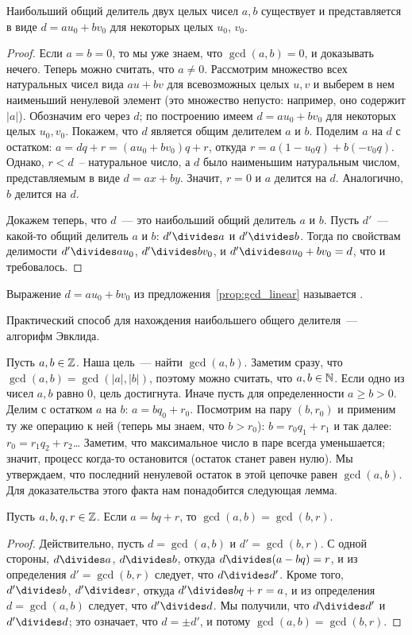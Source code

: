 \begin{proposition}\label{prop:gcd_linear}
Наибольший общий делитель двух целых чисел $a,b$ существует и
представляется в виде $d=au_0+bv_0$ для некоторых целых $u_0$, $v_0$.
\end{proposition}
\begin{proof}
Если $a=b=0$, то мы уже знаем, что $\gcd(a,b)=0$, и доказывать
нечего. Теперь можно считать, что $a\neq 0$.
Рассмотрим множество всех натуральных чисел вида $au+bv$ для
всевозможных целых $u,v$ и выберем в нем наименьший ненулевой
элемент (это множество непусто: например, оно содержит $|a|$).
Обозначим его через $d$; по
построению имеем $d=au_0+bv_0$ для некоторых целых $u_0,v_0$.
Покажем, что $d$ является общим делителем $a$ и $b$. Поделим $a$ на
$d$ с остатком: $a=dq+r=(au_0+bv_0)q+r$, откуда
$r=a(1-u_0q)+b(-v_0q)$. Однако, $r<d$~-- натуральное число, а $d$ было
наименьшим натуральным числом, представляемым в виде
$d=ax+by$. Значит, $r=0$ и $a$ делится на $d$. Аналогично, $b$ делится
на $d$.

Докажем
теперь, что $d$~--- это наибольший общий делитель $a$ и $b$. Пусть
$d'$~--- какой-то общий делитель $a$ и $b$: $d'\divides a$ и
$d'\divides b$. Тогда по свойствам делимости $d'\divides au_0$,
$d'\divides bv_0$, и
$d'\divides au_0+bv_0 = d$, что и требовалось.
\end{proof}

Выражение $d=au_0+bv_0$ из предложения~\ref{prop:gcd_linear}
называется
.

Практический способ для нахождения наибольшего общего делителя~---
алгорифм Эвклида.

Пусть $a,b\in\mathbb Z$. Наша цель~--- найти $\gcd(a,b)$. Заметим сразу,
что $\gcd(a,b) = \gcd(|a|,|b|)$, поэтому можно считать, что
$a,b\in\mathbb N$.
Если одно из
чисел $a,b$ равно $0$, цель достигнута.
Иначе пусть для определенности
$a\geq b>0$. Делим с остатком $a$ на $b$:
$a=bq_0+r_0$.
Посмотрим на пару $(b,r_0)$ и применим ту же операцию к ней (теперь мы
знаем, что $b>r_0$):
$b=r_0q_1+r_1$
и так далее:
$r_0=r_1q_2+r_2$\dots
Заметим, что максимальное число в паре всегда уменьшается; значит,
процесс когда-то остановится (остаток станет равен нулю).
Мы утверждаем, что последний ненулевой остаток в этой цепочке равен
$\gcd(a,b)$. Для доказательства этого факта нам понадобится следующая
лемма.
\begin{lemma}
Пусть $a,b,q,r\in\mathbb Z$.
Если $a=bq+r$, то $\gcd(a,b)=\gcd(b,r)$.
\end{lemma}
\begin{proof}
Действительно, пусть
$d=\gcd(a,b)$ и $d'=\gcd(b,r)$. С одной стороны, $d\divides a$,
$d\divides b$, откуда $d\divides (a-bq) = r$, и из определения
$d'=\gcd(b,r)$ следует, что
$d\divides d'$. Кроме того, $d'\divides b$, $d'\divides r$, откуда
$d'\divides bq+r = a$, и из определения $d=\gcd(a,b)$ следует, что
$d'\divides d$. Мы получили, что $d\divides d'$ и
$d'\divides d$; это означает, что $d=\pm d'$, и потому $\gcd(a,b) =
\gcd(b,r)$.
\end{proof}


